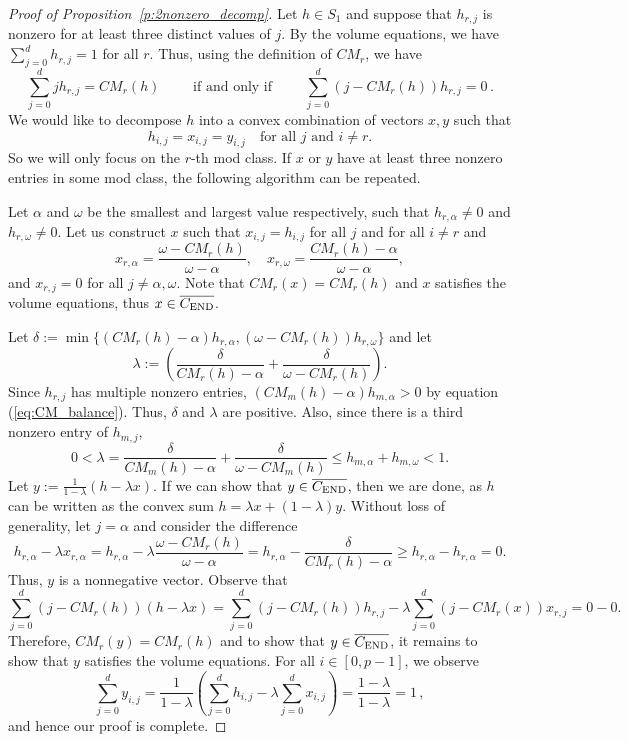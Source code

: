 \documentclass[12pt]{amsart}
\theoremstyle{definition}
\numberwithin{equation}{section}
\renewcommand\>{\rangle}
\newcommand\<{\langle}
\newcommand\0{\mathbf{0}}
\newcommand{\CEND}{C_\textnormal{END}}
\begin{document}
\begin{proof}[Proof of Proposition~\ref{p:2nonzero_decomp}]
	Let $h \in S_1$ and suppose that $h_{r,j}$ is nonzero for at least three distinct values of $j$. 
	By the volume equations, we have $\sum_{j=0}^dh_{r,j} = 1$ for all $r$.
	Thus, using the definition of $CM_r$, we have 
	\[
	\sum_{j=0}^d j h_{r,j} = CM_r(h) \qquad \text{ if and only if } \qquad \sum_{j=0}^d (j-CM_r(h))h_{r,j} = 0\, .
	\]
	We would like to decompose $h$ into a convex combination of vectors $x,y$ such that
	\[h_{i,j} = x_{i,j} = y_{i,j} \quad \text{for all } j \text{ and } i \neq r.\]
	So we will only focus on the $r$-th mod class. If $x$ or $y$ have at least three nonzero entries in some mod class, the following algorithm can be repeated.
	
	Let $\alpha$ and $\omega$ be the smallest and largest value respectively, such that $h_{r,\alpha} \neq 0$ and $h_{r,\omega} \neq 0$.
	Let us construct $x$ such that $x_{i,j} = h_{i,j}$ for all $j$ and for all $i \neq r$ and
	\[x_{r,\alpha} = \frac{\omega - CM_r(h)}{\omega - \alpha}, \quad x_{r,\omega} = \frac{CM_r(h) - \alpha}{ \omega - \alpha},\]
	and $x_{r,j} = 0$ for all $j \neq \alpha, \omega$. 
	Note that $CM_r(x) = CM_r(h)$ and $x$ satisfies the volume equations, thus $x \in \overline{\CEND}$.
	
	Let $\delta := \min\{(CM_r(h) - \alpha) h_{r, \alpha} , (\omega - CM_r(h)) h_{r,\omega}\}$ and let
	\[\lambda := \left(\frac{\delta}{CM_r(h) - \alpha} + \frac{\delta}{\omega - CM_r(h)}\right).\]
	Since $h_{r,j}$ has multiple nonzero entries, $(CM_m(h)-\alpha)h_{m,\alpha} > 0$ by equation (\ref{eq:CM_balance}). Thus, $\delta$ and $\lambda$ are positive. 
	Also, since there is a third nonzero entry of $h_{m,j}$,
	\[0 < \lambda = \frac{\delta}{CM_m(h)- \alpha} + \frac{\delta}{\omega - CM_m(h)} \leq  h_{m,\alpha} + h_{m,\omega} < 1.\]
	Let $y := \frac{1}{1-\lambda} (h -  \lambda x).$
	If we can show that $y \in \overline{\CEND}$, then we are done, as $h$ can be written as the convex sum $h = \lambda x + (1-\lambda) y$.
	Without loss of generality, let $j = \alpha$ and consider the difference
	\[h_{r,\alpha} - \lambda x_{r,\alpha} = h_{r,\alpha} - \lambda \frac{\omega - CM_r(h)}{\omega - \alpha} = h_{r,\alpha} - \frac{\delta}{CM_r(h) - \alpha} \geq h_{r,\alpha} - h_{r,\alpha} = 0.\]
	Thus, $y$ is a nonnegative vector. 
	Observe that 
	\[\sum_{j=0}^d (j-CM_r(h)) (h -  \lambda x) = \sum_{j = 0}^d (j-CM_r(h))h_{r,j} - \lambda\sum_{j=0}^d (j-CM_r(x))x_{r,j} = 0 - 0.\]
	Therefore, $CM_r(y) = CM_r(h)$ and to show that $y \in \overline{\CEND}$, it remains to show that $y$ satisfies the volume equations. For all $i \in [0,p-1]$, we observe
	\[\sum_{j = 0}^d y_{i,j} = \frac{1}{1-\lambda}\left(\sum_{j=0}^d h_{i,j} - \lambda\sum_{j=0}^d x_{i,j}\right) =\frac{1-\lambda}{1-\lambda} = 1 \, ,\]
	and hence our proof is complete.
\end{proof}
\end{document}
